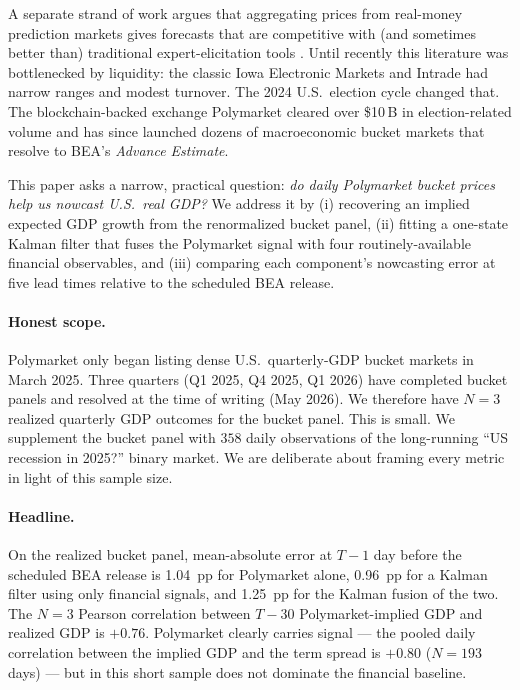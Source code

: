 \documentclass{article}
\begin{document}
A separate strand of work argues that aggregating prices from real-money prediction markets
gives forecasts that are competitive with (and sometimes better than) traditional
expert-elicitation tools \citep{wolfers2004prediction,snowberg2013prediction,page2013well,
atanasov2017distilling}. Until recently this literature was bottlenecked by liquidity: the
classic Iowa Electronic Markets and Intrade had narrow ranges and modest turnover. The 2024
U.S.\ election cycle changed that. The blockchain-backed exchange Polymarket cleared over
\$10\,B in election-related volume \citep{tsang2026anatomy,reichenbach2025polymarket} and has
since launched dozens of macroeconomic bucket markets that resolve to BEA's
\emph{Advance Estimate}.

This paper asks a narrow, practical question: \emph{do daily Polymarket bucket prices help us
nowcast U.S.\ real GDP?} We address it by (i) recovering an implied expected GDP growth from
the renormalized bucket panel, (ii) fitting a one-state Kalman filter that fuses the
Polymarket signal with four routinely-available financial observables, and (iii) comparing
each component's nowcasting error at five lead times relative to the scheduled BEA release.

\paragraph{Honest scope.} Polymarket only began listing dense U.S.\ quarterly-GDP bucket
markets in March 2025. Three quarters (Q1 2025, Q4 2025, Q1 2026) have completed bucket
panels and resolved at the time of writing (May 2026). We therefore have $N=3$ realized
quarterly GDP outcomes for the bucket panel. This is small. We supplement the bucket panel
with $358$ daily observations of the long-running ``US recession in 2025?'' binary market.
We are deliberate about framing every metric in light of this sample size.

\paragraph{Headline.} On the realized bucket panel, mean-absolute error at $T{-}1$ day
before the scheduled BEA release is 1.04~pp for Polymarket alone, 0.96~pp for a Kalman
filter using only financial signals, and 1.25~pp for the Kalman fusion of the two. The
$N=3$ Pearson correlation between $T{-}30$ Polymarket-implied GDP and realized GDP is
$+0.76$. Polymarket clearly carries signal --- the pooled daily correlation between the
implied GDP and the term spread is $+0.80$ ($N=193$ days) --- but in this short sample
does not dominate the financial baseline.
\end{document}

